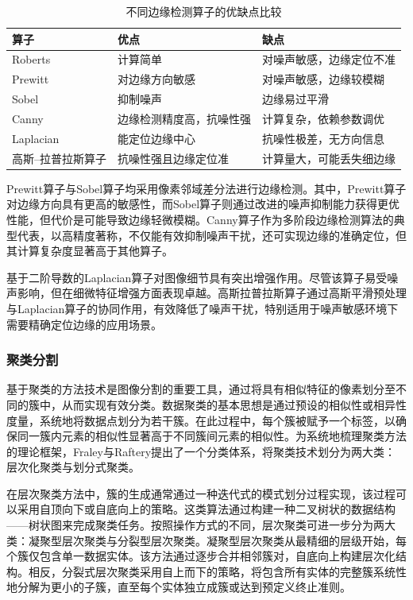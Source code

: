 \renewcommand{\tabularxcolumn}[1]{m{#1}}
\begin{table}[!htbp]
\centering
\caption{不同边缘检测算子的优缺点比较}
\label{tab:edge_detectors}
\begin{tabularx}{\textwidth}{@{}C C C@{}}
\toprule
\textbf{算子} & \textbf{优点} & \textbf{缺点} \\
\midrule
Roberts & 计算简单 & 对噪声敏感，边缘定位不准 \\
\addlinespace
Prewitt & 对边缘方向敏感 & 对噪声敏感，边缘较模糊 \\
\addlinespace
Sobel & 抑制噪声 & 边缘易过平滑\\
\addlinespace
Canny & 边缘检测精度高，抗噪性强 & 计算复杂，依赖参数调优\\
\addlinespace
Laplacian & 能定位边缘中心 & 抗噪性极差，无方向信息 \\
\addlinespace
高斯–拉普拉斯算子 & 抗噪性强且边缘定位准 & 计算量大，可能丢失细边缘 \\
\bottomrule
\end{tabularx}
\end{table}


Prewitt算子与Sobel算子均采用像素邻域差分法进行边缘检测。其中，Prewitt算子对边缘方向具有更高的敏感性，而Sobel算子则通过改进的噪声抑制能力获得更优性能，但代价是可能导致边缘轻微模糊。Canny算子作为多阶段边缘检测算法的典型代表，以高精度著称，不仅能有效抑制噪声干扰，还可实现边缘的准确定位，但其计算复杂度显著高于其他算子。

基于二阶导数的Laplacian算子对图像细节具有突出增强作用。尽管该算子易受噪声影响，但在细微特征增强方面表现卓越。高斯拉普拉斯算子通过高斯平滑预处理与Laplacian算子的协同作用，有效降低了噪声干扰，特别适用于噪声敏感环境下需要精确定位边缘的应用场景。

\subsubsection{聚类分割}

基于聚类的方法技术是图像分割的重要工具，通过将具有相似特征的像素划分至不同的簇中，从而实现有效分类。数据聚类的基本思想是通过预设的相似性或相异性度量，系统地将数据点划分为若干簇。在此过程中，每个簇被赋予一个标签，以确保同一簇内元素的相似性显著高于不同簇间元素的相似性。为系统地梳理聚类方法的理论框架，Fraley与Raftery提出了一个分类体系，将聚类技术划分为两大类：层次化聚类与划分式聚类。

在层次聚类方法中，簇的生成通常通过一种迭代式的模式划分过程实现，该过程可以采用自顶向下或自底向上的策略。这类算法通过构建一种二叉树状的数据结构——树状图来完成聚类任务。按照操作方式的不同，层次聚类可进一步分为两大类：凝聚型层次聚类与分裂型层次聚类。凝聚型层次聚类从最精细的层级开始，每个簇仅包含单一数据实体。该方法通过逐步合并相邻簇对，自底向上构建层次化结构。相反，分裂式层次聚类采用自上而下的策略，将包含所有实体的完整簇系统性地分解为更小的子簇，直至每个实体独立成簇或达到预定义终止准则。

